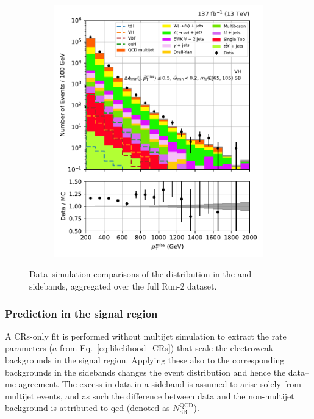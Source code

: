 \begin{figure}[htbp]
\begin{subfigure}[b]{0.45\textwidth}
        \includegraphics[width=\textwidth]{figures/region_plots/full_Run2/VH_sideband/VH.pdf}
        \caption{\VH}
    \end{subfigure}
    \caption[Data--simulation comparisons of the \ptmiss distribution in the \ttH and \VH sidebands, aggregated over the full Run-2 dataset]{Data--simulation comparisons of the \ptmiss distribution in the \ttH and \VH sidebands, aggregated over the full Run-2 dataset.}
    \label{fig:htoinv_sb_yields_combRun2}
\end{figure}




\subsubsection{Prediction in the signal region}
\label{subsubsec:htoinv_qcd_pred_SR}

A \glspl{CR}-only fit is performed without multijet simulation to extract the rate parameters ($a$ from Eq.~\ref{eq:likelihood_CRs}) that scale the electroweak backgrounds in the signal region. Applying these also to the corresponding backgrounds in the sidebands changes the event distribution and hence the data--\acrshort{mc} agreement. The excess in data in a sideband is assumed to arise solely from multijet events, and as such the difference between data and the non-multijet background is attributed to \acrshort{qcd} (denoted as $N_{\mathrm{SB}}^{\mathrm{QCD}}$).

